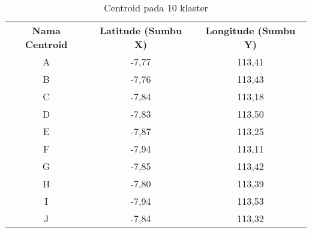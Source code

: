 \begin{table}[H]
\centering
\footnotesize
\begin{tabular}{ccc}
\rowcolor[HTML]{4472C4} 
{\color[HTML]{FFFFFF} \textbf{Nama   Centroid}} & {\color[HTML]{FFFFFF} \textbf{Latitude (Sumbu X)}} & {\color[HTML]{FFFFFF} \textbf{Longitude (Sumbu Y)}} \\
\rowcolor[HTML]{D9E1F2} 
A & -7,77 & 113,41 \\
B & -7,76 & 113,43 \\
\rowcolor[HTML]{D9E1F2} 
C & -7,84 & 113,18 \\
D & -7,83 & 113,50 \\
\rowcolor[HTML]{D9E1F2} 
E & -7,87 & 113,25 \\
F & -7,94 & 113,11 \\
\rowcolor[HTML]{D9E1F2} 
G & -7,85 & 113,42 \\
H & -7,80 & 113,39 \\
\rowcolor[HTML]{D9E1F2} 
I & -7,94 & 113,53 \\
J & -7,84 & 113,32
\end{tabular}
\caption{Centroid pada 10 klaster}
\label{tab:center10}
\end{table}
